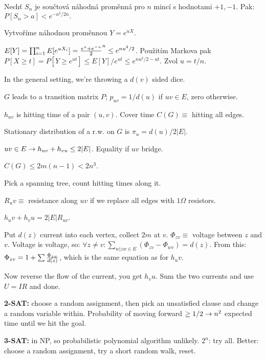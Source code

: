 \begin{multicols}{3}
 Nechť $S_n$ je součtová náhodná proměnná pro $n$ mincí s hodnotami ${+1,-1}$. Pak:
$P[S_n > a] < e^{-a^2 / 2n}.$

\prf{} Vytvoříme náhodnou proměnnou $Y = e^{uX}$.

$E[Y] = \prod_{i=1}^n E[e^{uX_i}] = {e^u + e^{-u} \over 2}^n \le e^{nu^2/2}$. Použitím Markova pak
$P[X \ge t] = P[Y \ge e^{ut}] \le E[Y] / e^{ut} \le e^{nu^2/2 - ut}$. Zvol $u =
t/n$.


In the general setting, we're throwing a $d(v)$ sided dice.

\dfn{} $G$ leads to a transition matrix $P$; $p_{uv} = 1/d(u)$ if $uv \in E$, zero otherwise.

\dfn{} $h_{uv}$ is hitting time of a pair $(u,v)$. Cover time $C(G) \equiv$ hitting all edges.

\thm{} Stationary distribution of a r.w. on $G$ is $\pi_{u} = d(u)/2|E|$. 

\thm{} $uv \in E \rightarrow h_{uv} + h_{vu} \le 2|E|$. Equality if $uv$ bridge.

\thm{} $C(G) \le  2m(n-1) < 2n^3$. 

\prf{} Pick a spanning tree, count hitting times along it.

\dfn{} $R_uv \equiv$ resistance along $uv$ if we replace all edges with $1\Omega$ resistors.

\thm{} $h_uv + h_vu = 2|E|R_{uv}$.

\prf{} Put $d(z)$ current into each vertex, collect $2m$ at $v$.
$\Phi_{zv} \equiv$ voltage between $z$ and $v$. Voltage is voltage, so:
$\forall z \ne v:  \sum_{w|zw \in E}(\Phi_{zv} - \Phi_{wv}) = d(z)$. From this:
$\Phi_{zv} = 1 + \sum {\Phi_{zw} \over d(z)}$, which is the same equation as
for $h_uv$.

Now reverse the flow of the current, you get $h_vu$. Sum the two currents and
use $U=IR$ and done.

{\bf 2-SAT:} choose a random assignment, then pick an unsatisfied clause and
change a random variable within. Probability of moving forward $\ge 1/2 \rightarrow
n^2$ expected time until we hit the goal.

{\bf 3-SAT:} in NP, so probabilistic polynomial algorithm unlikely. $2^n$: try all.
Better: choose a random assignment, try a short random walk, reset.






\end{multicols}
